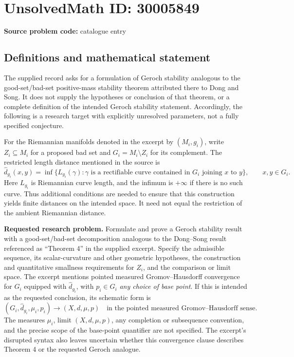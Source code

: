 \documentclass[11pt]{article}
\begin{document}
\section*{UnsolvedMath ID: 30005849}
\textbf{Source problem code:} catalogue entry
\subsection{Definitions and mathematical statement}
The supplied record asks for a formulation of Geroch stability analogous to the good-set/bad-set positive-mass stability theorem attributed there to Dong and Song. It does not supply the hypotheses or conclusion of that theorem, or a complete definition of the intended Geroch stability statement. Accordingly, the following is a research target with explicitly unresolved parameters, not a fully specified conjecture.

For the Riemannian manifolds denoted in the excerpt by \((M_i,g_i)\), write \(Z_i\subseteq M_i\) for a proposed bad set and \(G_i=M_i\setminus Z_i\) for its complement. The restricted length distance mentioned in the source is
\[
\widehat d_{g_i}(x,y)=\inf\{L_{g_i}(\gamma):\gamma\text{ is a rectifiable curve contained in }G_i\text{ joining }x\text{ to }y\},\qquad x,y\in G_i.
\]
Here \(L_{g_i}\) is Riemannian curve length, and the infimum is \(+\infty\) if there is no such curve. Thus additional conditions are needed to ensure that this construction yields finite distances on the intended space. It need not equal the restriction of the ambient Riemannian distance.

\textbf{Requested research problem.} Formulate and prove a Geroch stability result with a good-set/bad-set decomposition analogous to the Dong--Song result referenced as ``Theorem 4'' in the supplied excerpt. Specify the admissible sequence, its scalar-curvature and other geometric hypotheses, the construction and quantitative smallness requirements for \(Z_i\), and the comparison or limit space. The excerpt mentions pointed measured Gromov--Hausdorff convergence for \(G_i\) equipped with \(\widehat d_{g_i}\), with \(p_i\in G_i\) \emph{any choice of base point}. If this is intended as the requested conclusion, its schematic form is
\[
(G_i,\widehat d_{g_i},\mu_i,p_i)\longrightarrow (X,d,\mu,p)
\quad\text{in the pointed measured Gromov--Hausdorff sense}.
\]
The measures \(\mu_i\), limit \((X,d,\mu,p)\), any completion or subsequence convention, and the precise scope of the base-point quantifier are not specified. The excerpt's disrupted syntax also leaves uncertain whether this convergence clause describes Theorem 4 or the requested Geroch analogue.
\end{document}
